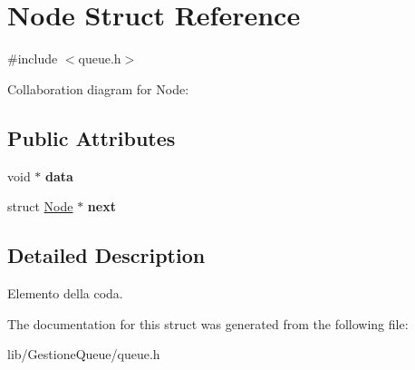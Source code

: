 \hypertarget{structNode}{}\section{Node Struct Reference}
\label{structNode}


{\ttfamily \#include $<$queue.\+h$>$}



Collaboration diagram for Node\+:
\subsection*{Public Attributes}
\begin{DoxyCompactItemize}
\item 
\mbox{\label{structNode_a38b733496e3eff5e0b4fcb11cd9b866a}} 
void $\ast$ {\bfseries data}
\item 
\mbox{\label{structNode_af67b110ca1a258b793bf69d306929b22}} 
struct \hyperlink{structNode}{Node} $\ast$ {\bfseries next}
\end{DoxyCompactItemize}


\subsection{Detailed Description}
Elemento della coda. 

The documentation for this struct was generated from the following file\+:\begin{DoxyCompactItemize}
\item 
lib/\+Gestione\+Queue/queue.\+h\end{DoxyCompactItemize}
